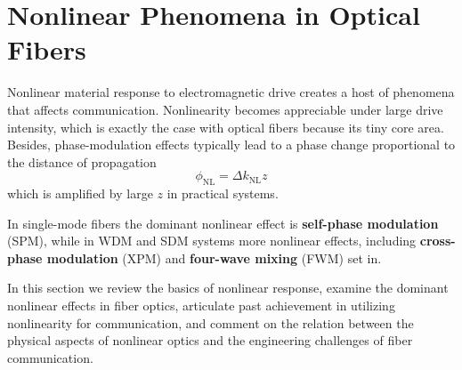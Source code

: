 \documentclass[%
 reprint,
 amsmath,amssymb,
 aps,
]{revtex4-2}
\begin{document}
\section{Nonlinear Phenomena in Optical Fibers}
Nonlinear material response to 
electromagnetic drive creates a host of 
phenomena that affects communication. 
Nonlinearity becomes 
appreciable under large drive intensity, 
which is exactly the case with optical fibers 
because its tiny core area. 
Besides, phase-modulation effects typically 
lead to a phase change proportional to the 
distance of propagation 
\begin{equation}
    \label{eqn:NonlinearPhaseShift}
    \phi_{\text{NL}}
    =
    \Delta k_{\text{NL}} z
\end{equation}
which is amplified by large $z$ 
in practical systems. 
\par
In single-mode fibers the dominant nonlinear effect 
is \textbf{self-phase modulation} (SPM), 
while in WDM and SDM systems more nonlinear effects, 
including \textbf{cross-phase modulation} (XPM) and 
\textbf{four-wave mixing} (FWM) set in. 
\par
In this section we 
review the basics of nonlinear response, 
examine the dominant nonlinear effects 
in fiber optics, 
articulate past achievement in 
utilizing nonlinearity for communication, 
and comment on the relation between 
the physical aspects of nonlinear optics and 
the engineering challenges of fiber communication. 
\end{document}
